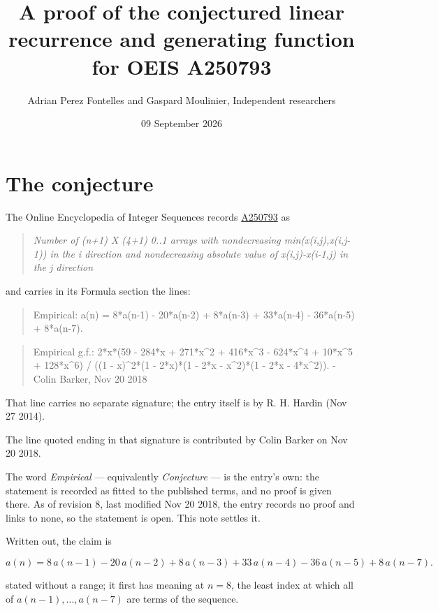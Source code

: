 \documentclass[11pt]{article}
\title{A proof of the conjectured linear recurrence and generating function for OEIS A250793}
\author{Adrian Perez Fontelles and Gaspard Moulinier, Independent researchers}
\date{09 September 2026}
\theoremstyle{definition}
\begin{document}
\maketitle
\section{The conjecture}

The Online Encyclopedia of Integer Sequences records \href{https://oeis.org/A250793}{A250793} as

\begin{quote}\itshape Number of (n+1) X (4+1) 0..1 arrays with nondecreasing min(x(i,j),x(i,j-1)) in the i direction and nondecreasing absolute value of x(i,j)-x(i-1,j) in the j direction\end{quote}

and carries in its Formula section the lines:

\begin{quote}\ttfamily Empirical: a(n) = 8*a(n-1) - 20*a(n-2) + 8*a(n-3) + 33*a(n-4) - 36*a(n-5) + 8*a(n-7).\end{quote}

\begin{quote}\ttfamily Empirical g.f.: 2*x*(59 - 284*x + 271*x\textasciicircum{}2 + 416*x\textasciicircum{}3 - 624*x\textasciicircum{}4 + 10*x\textasciicircum{}5 + 128*x\textasciicircum{}6) / ((1 - x)\textasciicircum{}2*(1 - 2*x)*(1 - 2*x - x\textasciicircum{}2)*(1 - 2*x - 4*x\textasciicircum{}2)). - Colin Barker, Nov 20 2018\end{quote}

That line carries no separate signature; the entry itself is by R. H. Hardin (Nov 27 2014).

The line quoted ending in that signature is contributed by Colin Barker on Nov 20 2018.

The word {\itshape Empirical} --- equivalently {\itshape Conjecture} --- is the entry's own: the statement is recorded as fitted to the published terms, and no proof is given there. As of revision 8, last modified Nov 20 2018, the entry records no proof and links to none, so the statement is open. This note settles it.

Written out, the claim is

\[a(n) = 8\,a(n-1) - 20\,a(n-2) + 8\,a(n-3) + 33\,a(n-4) - 36\,a(n-5) + 8\,a(n-7).\]

stated without a range; it first has meaning at $n = 8$, the least index at which all of $a(n-1),\dots,a(n-7)$ are terms of the sequence.
\end{document}
